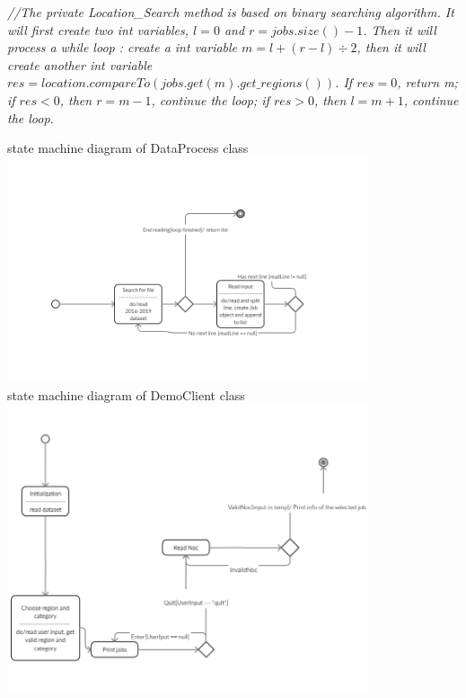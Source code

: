 \documentclass[12pt]{article}
\begin{document}
\noindent \textit{//The private Location\_Search method is based on binary searching algorithm. It will first create two int variables, $l = 0$ and $r = jobs.size()-1$. Then it will process a while loop : create a int variable $m = l + (r - l) \div 2$, then it will create another int variable $res = location.compareTo(jobs.get(m).get\_regions())$. If $res = 0$, return m; if $res < 0$, then $r = m-1$, continue the loop; if $res > 0$, then $l = m + 1$, continue the loop.}\\
\newpage
\begin{center}
\noindent state machine diagram of DataProcess class
\includegraphics[width=0.8\textwidth]{state machine 1.png}\\
\noindent state machine diagram of DemoClient class
\includegraphics[width=0.8\textwidth]{state machine 2.png}\\
\end{center}
\end{document}
